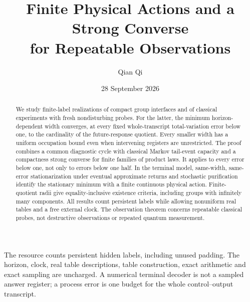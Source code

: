 \documentclass[11pt]{amsart}
\title[Finite actions and a process strong converse]{Finite Physical Actions and a Strong Converse\\for Repeatable Observations}
\author{Qian Qi}
\date{28 September 2026}
\numberwithin{equation}{section}
\theoremstyle{definition}\newtheorem{definition}[theorem]{Definition}
\theoremstyle{remark}\newtheorem{remark}[theorem]{Remark}
\begin{document}
\begin{abstract}
We study finite-label realizations of compact group interfaces and of
classical experiments with fresh nondisturbing probes. For the latter,
the minimum horizon-dependent width converges, at every fixed
whole-transcript total-variation error below one, to the cardinality of
the future-response quotient. Every smaller width has a uniform
occupation bound even when intervening registers are unrestricted.
The proof combines a common diagnostic cycle with classical Markov
tail-event capacity and a compactness strong converse for finite
families of product laws. It applies to every error below one, not only
to errors below one half. In the terminal model, same-width,
same-error stationarization under eventual approximate returns and
stochastic purification identify the stationary minimum with a finite
continuous physical action. Finite-quotient radii give equality-inclusive
existence criteria, including groups with infinitely many components.
All results count persistent labels while allowing nonuniform real
tables and a free external clock. The observation theorem concerns
repeatable classical probes, not destructive observations or repeated
quantum measurement.
\end{abstract}
\maketitle
\noindent The resource counts persistent hidden labels, including unused
padding. The horizon, clock, real table descriptions, table construction,
exact arithmetic and exact sampling are uncharged. A numerical terminal
decoder is not a sampled answer register; a process error is one budget
for the whole control--output transcript.
















\end{document}
